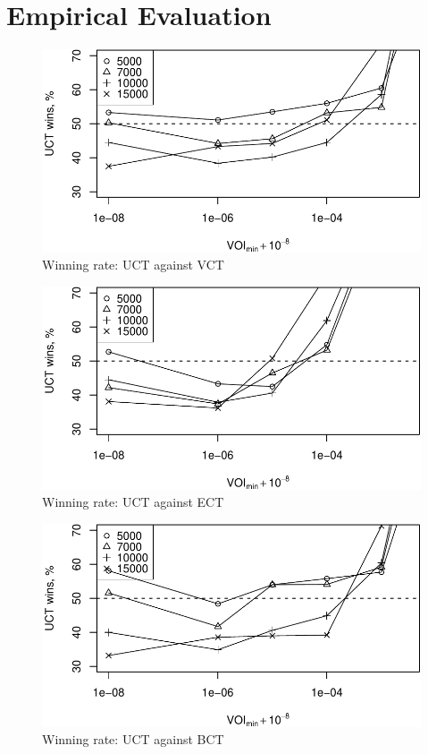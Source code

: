 \documentclass{article}
\begin{document}
\section{Empirical Evaluation}

\begin{figure}[h]
\centering
\includegraphics[scale=0.8]{vct-wins.pdf}
\caption{Winning rate: UCT against VCT}
\label{fig:uct-against-vct}
\end{figure}

\begin{figure}[h]
\centering
\includegraphics[scale=0.8]{ect-wins.pdf}
\caption{Winning rate: UCT against ECT}
\label{fig:uct-against-ect}
\end{figure}

\begin{figure}[h]
\centering
\includegraphics[scale=0.8]{bct-wins.pdf}
\caption{Winning rate: UCT against BCT}
\label{fig:uct-against-bct}
\end{figure}
\end{document}
